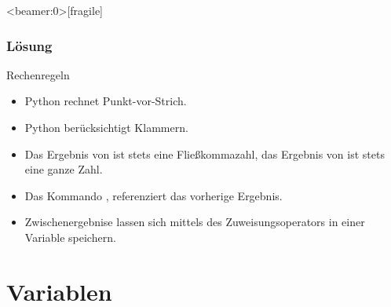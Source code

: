 \begin{frame}<beamer:0>[fragile]
\frametitle{Lösung}
\begin{solutionblock}{Rechenregeln}
	\begin{itemize}
		\item Python rechnet Punkt-vor-Strich.
		\item Python berücksichtigt Klammern.
		\item Das Ergebnis von \py{/} ist stets eine Fließkommazahl, das Ergebnis von \py{//} ist stets eine ganze Zahl. 
		\item Das Kommando \py{_}, referenziert das vorherige Ergebnis. 
		\item Zwischenergebnise lassen sich mittels des Zuweisungsoperators \py{=} in einer Variable speichern. 
	\end{itemize}
\end{solutionblock}
\end{frame}

\section{Variablen}

\begin{frame}


\end{frame}


